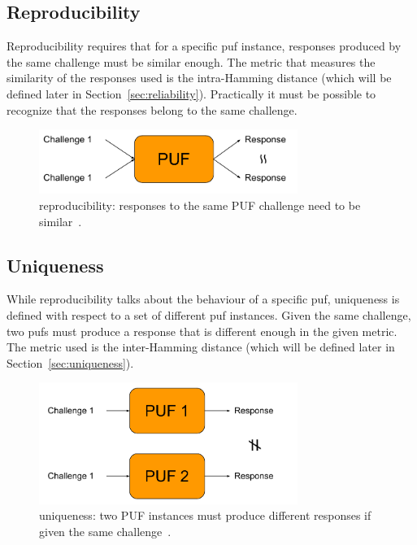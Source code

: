 \subsection*{Reproducibility}\label{sec:reproducibility}

Reproducibility requires that for a specific \gls{puf} instance, responses produced by the same challenge must be similar enough. The metric that measures the similarity of the responses used is the intra-Hamming distance (which will be defined later in Section~\ref{sec:reliability}). Practically it must be possible to recognize that the responses belong to the same challenge.

\begin{figure}[h!]
    \centering
    \captionsetup{justification=centering,margin=0.5cm}
    \includegraphics[width=0.75\textwidth]{images/reproducibility}
    \caption[Reproducibility: responses to the same PUF challenge need to be similar.]{reproducibility: responses to the same PUF challenge need to be similar~\cite{Kodytek2017}.}
    \label{fig:reproducibility}
\end{figure}

\subsection*{Uniqueness}

While reproducibility talks about the behaviour of a specific \gls{puf}, uniqueness is defined with respect to a set of different \gls{puf} instances. Given the same challenge, two \glspl{puf} must produce a response that is different enough in the given metric. The metric used is the inter-Hamming distance (which will be defined later in Section~\ref{sec:uniqueness}).

\begin{figure}[ht!]
    \centering
    \captionsetup{justification=centering,margin=0.5cm}
    \includegraphics[width=0.75\textwidth]{images/uniqueness}
    \caption[Uniqueness: two PUF instances must produce different responses if given the same challenge.]{uniqueness: two PUF instances must produce different responses if given the same challenge~\cite{Kodytek2017}.}
    \label{fig:uniqueness}
\end{figure}

